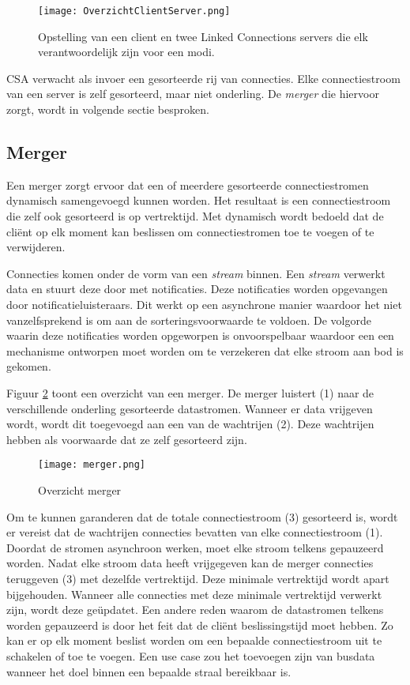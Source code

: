 \begin{figure}[h!]
\centering
\texttt{[image: OverzichtClientServer.png]}
\label{overzichtclientserver}
\caption{Opstelling van een client en twee Linked Connections servers die elk verantwoordelijk zijn voor een modi.}
\end{figure}

CSA verwacht als invoer een gesorteerde rij van connecties. Elke connectiestroom van een server is zelf gesorteerd, maar niet onderling.  De \textit{merger} die hiervoor zorgt, wordt in volgende sectie besproken.

\subsection{Merger}

Een merger zorgt ervoor dat een of meerdere gesorteerde connectiestromen dynamisch samengevoegd kunnen worden. Het resultaat is een connectiestroom die zelf ook gesorteerd is op vertrektijd. Met dynamisch wordt bedoeld dat de cli\"ent op elk moment kan beslissen om connectiestromen toe te voegen of te verwijderen.

Connecties komen onder de vorm van een \textit{stream} binnen. Een \textit{stream} verwerkt data en stuurt deze door met notificaties. Deze notificaties worden opgevangen door notificatieluisteraars. Dit werkt op een asynchrone manier waardoor het niet vanzelfsprekend is om aan de sorteringsvoorwaarde te voldoen. De volgorde waarin deze notificaties worden opgeworpen is onvoorspelbaar waardoor een een mechanisme ontworpen moet worden om te verzekeren dat elke stroom aan bod is gekomen.
 
Figuur \ref{merger} toont een overzicht van een merger. De merger luistert (1) naar de verschillende onderling gesorteerde datastromen. Wanneer er data vrijgeven wordt, wordt dit toegevoegd aan een van de wachtrijen (2). Deze wachtrijen hebben als voorwaarde dat ze zelf gesorteerd zijn.

\begin{figure}[h!]
\centering
\texttt{[image: merger.png]}
\caption{Overzicht merger}
\label{merger}
\end{figure}

Om te kunnen garanderen dat de totale connectiestroom (3) gesorteerd is, wordt er vereist dat de wachtrijen connecties bevatten van elke connectiestroom (1). Doordat de stromen asynchroon werken, moet elke stroom telkens gepauzeerd worden. Nadat elke stroom data heeft vrijgegeven kan de merger connecties teruggeven (3) met dezelfde vertrektijd. Deze minimale vertrektijd wordt apart bijgehouden. Wanneer alle connecties met deze minimale vertrektijd verwerkt zijn, wordt deze ge\"updatet.
Een andere reden waarom de datastromen telkens worden gepauzeerd is door het feit dat de cli\"ent beslissingstijd moet hebben. Zo kan er op elk moment beslist worden om een bepaalde connectiestroom uit te schakelen of toe te voegen. Een use case zou het toevoegen zijn van busdata wanneer het doel binnen een bepaalde straal bereikbaar is.

